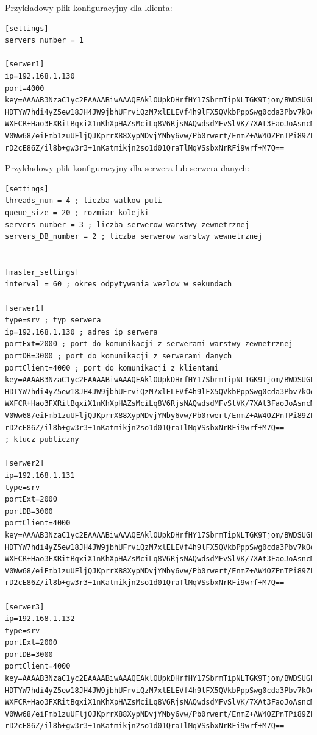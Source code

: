 Przykładowy plik konfiguracyjny dla klienta:
\begin{lstlisting}[style=incode, caption=Plik konfiguracyjny klienta]
[settings]
servers_number = 1

[serwer1]
ip=192.168.1.130
port=4000
key=AAAAB3NzaC1yc2EAAAABiwAAAQEAklOUpkDHrfHY17SbrmTipNLTGK9Tjom/BWDSUGPl+nafzl
HDTYW7hdi4yZ5ew18JH4JW9jbhUFrviQzM7xlELEVf4h9lFX5QVkbPppSwg0cda3Pbv7kOdJ/MtyBl
WXFCR+Hao3FXRitBqxiX1nKhXpHAZsMciLq8V6RjsNAQwdsdMFvSlVK/7XAt3FaoJoAsncM1Q9x5+3
V0Ww68/eiFmb1zuUFljQJKprrX88XypNDvjYNby6vw/Pb0rwert/EnmZ+AW4OZPnTPi89ZPmVMLuay
rD2cE86Z/il8b+gw3r3+1nKatmikjn2so1d01QraTlMqVSsbxNrRFi9wrf+M7Q==
\end{lstlisting}

Przykładowy plik konfiguracyjny dla serwera lub serwera danych:
\begin{lstlisting}[style=incode, caption=Plik konfiguracyjny serwera]
[settings]
threads_num = 4 ; liczba watkow puli
queue_size = 20 ; rozmiar kolejki
servers_number = 3 ; liczba serwerow warstwy zewnetrznej
servers_DB_number = 2 ; liczba serwerow warstwy wewnetrznej


[master_settings]
interval = 60 ; okres odpytywania wezlow w sekundach

[serwer1]
type=srv ; typ serwera
ip=192.168.1.130 ; adres ip serwera
portExt=2000 ; port do komunikacji z serwerami warstwy zewnetrznej
portDB=3000 ; port do komunikacji z serwerami danych
portClient=4000 ; port do komunikacji z klientami
key=AAAAB3NzaC1yc2EAAAABiwAAAQEAklOUpkDHrfHY17SbrmTipNLTGK9Tjom/BWDSUGPl+nafzl
HDTYW7hdi4yZ5ew18JH4JW9jbhUFrviQzM7xlELEVf4h9lFX5QVkbPppSwg0cda3Pbv7kOdJ/MtyBl
WXFCR+Hao3FXRitBqxiX1nKhXpHAZsMciLq8V6RjsNAQwdsdMFvSlVK/7XAt3FaoJoAsncM1Q9x5+3
V0Ww68/eiFmb1zuUFljQJKprrX88XypNDvjYNby6vw/Pb0rwert/EnmZ+AW4OZPnTPi89ZPmVMLuay
rD2cE86Z/il8b+gw3r3+1nKatmikjn2so1d01QraTlMqVSsbxNrRFi9wrf+M7Q== 
; klucz publiczny

[serwer2]
ip=192.168.1.131
type=srv
portExt=2000
portDB=3000
portClient=4000
key=AAAAB3NzaC1yc2EAAAABiwAAAQEAklOUpkDHrfHY17SbrmTipNLTGK9Tjom/BWDSUGPl+nafzl
HDTYW7hdi4yZ5ew18JH4JW9jbhUFrviQzM7xlELEVf4h9lFX5QVkbPppSwg0cda3Pbv7kOdJ/MtyBl
WXFCR+Hao3FXRitBqxiX1nKhXpHAZsMciLq8V6RjsNAQwdsdMFvSlVK/7XAt3FaoJoAsncM1Q9x5+3
V0Ww68/eiFmb1zuUFljQJKprrX88XypNDvjYNby6vw/Pb0rwert/EnmZ+AW4OZPnTPi89ZPmVMLuay
rD2cE86Z/il8b+gw3r3+1nKatmikjn2so1d01QraTlMqVSsbxNrRFi9wrf+M7Q==

[serwer3]
ip=192.168.1.132
type=srv
portExt=2000
portDB=3000
portClient=4000
key=AAAAB3NzaC1yc2EAAAABiwAAAQEAklOUpkDHrfHY17SbrmTipNLTGK9Tjom/BWDSUGPl+nafzl
HDTYW7hdi4yZ5ew18JH4JW9jbhUFrviQzM7xlELEVf4h9lFX5QVkbPppSwg0cda3Pbv7kOdJ/MtyBl
WXFCR+Hao3FXRitBqxiX1nKhXpHAZsMciLq8V6RjsNAQwdsdMFvSlVK/7XAt3FaoJoAsncM1Q9x5+3
V0Ww68/eiFmb1zuUFljQJKprrX88XypNDvjYNby6vw/Pb0rwert/EnmZ+AW4OZPnTPi89ZPmVMLuay
rD2cE86Z/il8b+gw3r3+1nKatmikjn2so1d01QraTlMqVSsbxNrRFi9wrf+M7Q==


\end{lstlisting}
